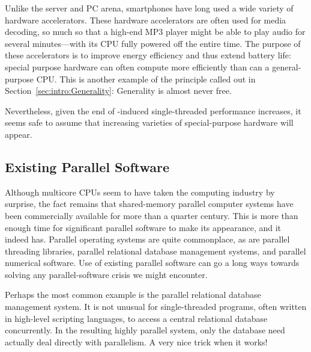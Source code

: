 Unlike the server and PC arena, smartphones have long used a wide
variety of hardware accelerators.
These hardware accelerators are often used for media decoding,
so much so that a high-end MP3 player might be able to play audio
for several minutes---with its CPU fully powered off the entire time.
The purpose of these accelerators is to improve energy efficiency
and thus extend battery life: special purpose hardware can often
compute more efficiently than can a general-purpose CPU\@.
This is another example of the principle called out in
Section~\ref{sec:intro:Generality}: Generality is almost never free.

Nevertheless, given the end of -induced
single-threaded performance increases, it seems safe to assume that
increasing varieties of special-purpose hardware will appear.

\subsection{Existing Parallel Software}
\label{sec:cpu:Existing Parallel Software}

Although multicore CPUs seem to have taken the computing industry
by surprise, the fact remains that shared-memory parallel computer
systems have been commercially available for more than a quarter
century.
This is more than enough time for significant parallel software
to make its appearance, and it indeed has.
Parallel operating systems are quite commonplace, as are parallel
threading libraries, parallel relational database management systems, 
and parallel numerical software.
Use of existing parallel software can go a long ways towards solving any
parallel-software crisis we might encounter.

Perhaps the most common example is the parallel relational database
management system.
It is not unusual for single-threaded programs, often written in
high-level scripting languages, to access a central relational
database concurrently.
In the resulting highly parallel system, only the database need actually
deal directly with parallelism.
A very nice trick when it works!
